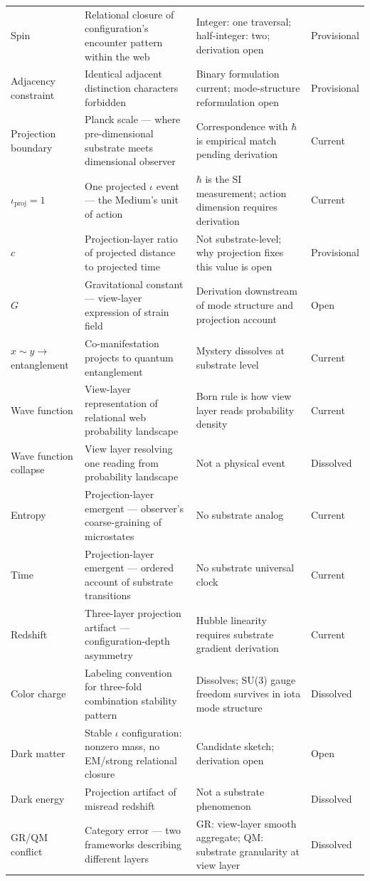 \documentclass[11pt,letterpaper]{article}
\begin{document}
\begin{table}[htbp]
\begin{tabular}{llp{4.5cm}l}
Spin & Relational closure of configuration's encounter pattern within the web & Integer: one traversal; half-integer: two; derivation open & Provisional\\[0pt]
Adjacency constraint & Identical adjacent distinction characters forbidden & Binary formulation current; mode-structure reformulation open & Provisional\\[0pt]
Projection boundary & Planck scale --- where pre-dimensional substrate meets dimensional observer & Correspondence with \(\hbar\) is empirical match pending derivation & Current\\[0pt]
\(\iota_{\mathrm{proj}} = 1\) & One projected \(\iota\) event --- the Medium's unit of action & \(\hbar\) is the SI measurement; action dimension requires derivation & Current\\[0pt]
\(c\) & Projection-layer ratio of projected distance to projected time & Not substrate-level; why projection fixes this value is open & Provisional\\[0pt]
\(G\) & Gravitational constant --- view-layer expression of strain field & Derivation downstream of mode structure and projection account & Open\\[0pt]
\(x \sim y \to\) entanglement & Co-manifestation projects to quantum entanglement & Mystery dissolves at substrate level & Current\\[0pt]
Wave function & View-layer representation of relational web probability landscape & Born rule is how view layer reads probability density & Current\\[0pt]
Wave function collapse & View layer resolving one reading from probability landscape & Not a physical event & Dissolved\\[0pt]
Entropy & Projection-layer emergent --- observer's coarse-graining of microstates & No substrate analog & Current\\[0pt]
Time & Projection-layer emergent --- ordered account of substrate transitions & No substrate universal clock & Current\\[0pt]
Redshift & Three-layer projection artifact --- configuration-depth asymmetry & Hubble linearity requires substrate gradient derivation & Current\\[0pt]
Color charge & Labeling convention for three-fold combination stability pattern & Dissolves; SU(3) gauge freedom survives in iota mode structure & Dissolved\\[0pt]
Dark matter & Stable \(\iota\) configuration: nonzero mass, no EM/strong relational closure & Candidate sketch; derivation open & Open\\[0pt]
Dark energy & Projection artifact of misread redshift & Not a substrate phenomenon & Dissolved\\[0pt]
GR/QM conflict & Category error --- two frameworks describing different layers & GR: view-layer smooth aggregate; QM: substrate granularity at view layer & Dissolved\\[0pt]
\bottomrule
\end{tabular}
\end{table}
\end{document}
